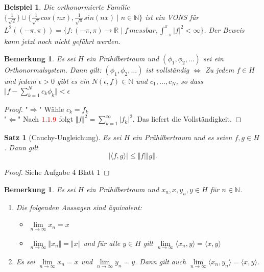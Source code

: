 \documentclass[12pt,titlepage]{article}
\newtheorem{bsp}[zahl]{Beispiel}
\newtheorem{bemerkung}[zahl]{Bemerkung}
\newtheorem{satz}[zahl]{Satz}
\numberwithin{equation}{section}
\begin{document}
 \begin{bsp}
 Die orthonormierte Familie $\{\frac{1}{\sqrt{2}}\}\cup \{\frac{1}{\sqrt{\pi}}cos(nx),\frac{1}{\sqrt{\pi}}sin(nx)\mid n \in \mathbb{N}\}$ ist ein VONS für $L^2((-\pi,\pi))=\{f:(-\pi,\pi)\to \mathbb{R} \mid f \, messbar, \int_{-\pi}^\pi \vert f \vert^2 < \infty\}$. Der Beweis kann jetzt noch nicht geführt werden.
 \end{bsp}
\begin{bemerkung}
Es sei $H$ ein Prähilbertraum und $(\phi_1,\phi_2,\ldots)$ sei ein Orthonormalsystem. Dann gilt: $(\phi_1,\phi_2,\ldots)$ ist vollständig $\Leftrightarrow$ Zu jedem $f\in H$ und jedem $\epsilon>0 $ gibt es ein $N(\epsilon,f) \in \mathbb{N}$ und $c_1 ,\ldots,c_N$, so dass $ \Vert f- \sum_{k=1}^N c_k \phi_k \Vert <\epsilon$
\end{bemerkung}
\begin{proof}
"$\Rightarrow$" Wähle $c_k=f_k$\\
"$\Leftarrow$" Nach $\textcolor{red}{1.1.9}$ folgt $\Vert f \Vert^2=\sum_{k=1}^{\infty}\vert f_k\vert^2 $. Das liefert die Vollständigkeit.
\end{proof}
\begin{satz}[Cauchy-Ungleichung]
Es sei $H$ ein Prähilbertraum und es seien $f,g \in H$. Dann gilt 
\[
\vert \langle f,g \rangle\vert \leq \Vert f \vert \Vert g\Vert.
\]
\end{satz}
\begin{proof}
Siehe Aufgabe 4 Blatt 1
\end{proof}
\begin{bemerkung}
Es sei $H$ ein Prähilbertraum und $x_n,x,y_n,y\in H$ für $n\in \mathbb{N}$.
\begin{enumerate}
\item  Die folgenden Aussagen sind äquivalent:
\begin{itemize}
\item[a)] $\underset{n \rightarrow \infty}{\lim} x_n=x$
\item[b)] $\underset{n \rightarrow \infty}{\lim} \Vert x_n \Vert =\Vert x \Vert$ und für alle $y\in H$ gilt $\underset{n \rightarrow \infty}{\lim} \langle x_n,y \rangle= \langle x,y \rangle$
\end{itemize}
\item Es sei $\underset{n \rightarrow \infty}{\lim} x_n =x$ und $\underset{n \rightarrow \infty}{\lim} y_n=y$. Dann gilt auch $\underset{n \rightarrow \infty}{\lim} \langle x_n, y_n \rangle = \langle x,y \rangle.$
\end{enumerate}
\end{bemerkung}
\end{document}
